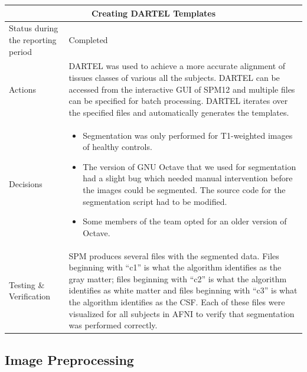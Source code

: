 \documentclass[12pt]{article}
\begin{document}
\begin{table}[H]
  \centering
  \begin{tabular} {| m{3.3cm} | m{11.5cm} | }
    \hline
    \multicolumn{2}{|c|}{Creating DARTEL Templates} \\ \hline
    Status during the reporting period   & Completed \\ \hline
    Actions &
    DARTEL was used to achieve a more accurate alignment of tissues
    classes of various all the subjects. DARTEL can be accessed from
    the interactive GUI of SPM12 and multiple files can be specified
    for batch processing. DARTEL iterates over the specified files and
    automatically generates the templates.
    \\ \hline

    Decisions &
    \begin{itemize}

      \item Segmentation was only performed for T1-weighted images of
        healthy controls.

      \item The version of GNU Octave that we used for segmentation
        had a slight bug which needed manual intervention before the
        images could be segmented. The source code for the
        segmentation script had to be modified.

      \item Some members of the team opted for an older version of
        Octave.

    \end{itemize} \\ \hline

    Testing \& Verification &
    SPM produces several files with the segmented data. Files
    beginning with ``c1'' is what the algorithm identifies as the gray
    matter; files beginning with ``c2'' is what the algorithm
    identifies as white matter and files beginning with ``c3'' is what
    the algorithm identifies as the CSF. Each of these files were
    visualized for all subjects in AFNI to verify that segmentation
    was performed correctly. \\ \hline

  \end{tabular}
\end{table}

\newpage

\subsection{Image Preprocessing}
\end{document}
